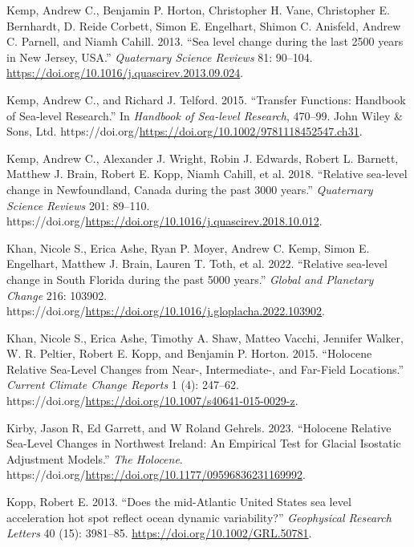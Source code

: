 \begin{CSLReferences}{1}{0}
\leavevmode{}%
Kemp, Andrew C., Benjamin P. Horton, Christopher H. Vane, Christopher E. Bernhardt, D. Reide Corbett, Simon E. Engelhart, Shimon C. Anisfeld, Andrew C. Parnell, and Niamh Cahill. 2013. {``{Sea level change during the last 2500 years in New Jersey, USA}.''} \emph{Quaternary Science Reviews} 81: 90--104. \url{https://doi.org/10.1016/j.quascirev.2013.09.024}.

\leavevmode{}%
Kemp, Andrew C., and Richard J. Telford. 2015. {``Transfer Functions: Handbook of Sea‐level Research.''} In \emph{Handbook of Sea‐level Research}, 470--99. John Wiley \& Sons, Ltd. https://doi.org/\url{https://doi.org/10.1002/9781118452547.ch31}.

\leavevmode{}%
Kemp, Andrew C., Alexander J. Wright, Robin J. Edwards, Robert L. Barnett, Matthew J. Brain, Robert E. Kopp, Niamh Cahill, et al. 2018. {``{Relative sea-level change in Newfoundland, Canada during the past 3000 years}.''} \emph{Quaternary Science Reviews} 201: 89--110. https://doi.org/\url{https://doi.org/10.1016/j.quascirev.2018.10.012}.

\leavevmode{}%
Khan, Nicole S., Erica Ashe, Ryan P. Moyer, Andrew C. Kemp, Simon E. Engelhart, Matthew J. Brain, Lauren T. Toth, et al. 2022. {``{Relative sea-level change in South Florida during the past 5000 years}.''} \emph{Global and Planetary Change} 216: 103902. https://doi.org/\url{https://doi.org/10.1016/j.gloplacha.2022.103902}.

\leavevmode{}%
Khan, Nicole S., Erica Ashe, Timothy A. Shaw, Matteo Vacchi, Jennifer Walker, W. R. Peltier, Robert E. Kopp, and Benjamin P. Horton. 2015. {``Holocene Relative Sea-Level Changes from Near-, Intermediate-, and Far-Field Locations.''} \emph{Current Climate Change Reports} 1 (4): 247--62. https://doi.org/\url{https://doi.org/10.1007/s40641-015-0029-z}.

\leavevmode{}%
Kirby, Jason R, Ed Garrett, and W Roland Gehrels. 2023. {``Holocene Relative Sea-Level Changes in Northwest Ireland: An Empirical Test for Glacial Isostatic Adjustment Models.''} \emph{The Holocene}. https://doi.org/\url{https://doi.org/10.1177/09596836231169992}.

\leavevmode{}%
Kopp, Robert E. 2013. {``{Does the mid-Atlantic United States sea level acceleration hot spot reflect ocean dynamic variability?}''} \emph{Geophysical Research Letters} 40 (15): 3981--85. \url{https://doi.org/10.1002/GRL.50781}.


\end{CSLReferences}
